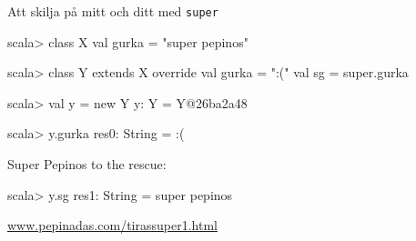 \begin{Slide}{Att skilja på mitt och ditt med \texttt{super}}
\begin{REPL}
scala> class X { val gurka = "super pepinos" }

scala> class Y extends X { 
         override val gurka = ":("
         val sg = super.gurka 
       }

scala> val y = new Y
y: Y = Y@26ba2a48

scala> y.gurka
res0: String = :(
\end{REPL}
Super Pepinos to the rescue:
\pause
\begin{REPLnonum}
scala> y.sg
res1: String = super pepinos

\end{REPLnonum}


\pause
{}
\href{http://www.pepinadas.com/tirassuper1.html}{\small www.pepinadas.com/tirassuper1.html}
\end{Slide}






